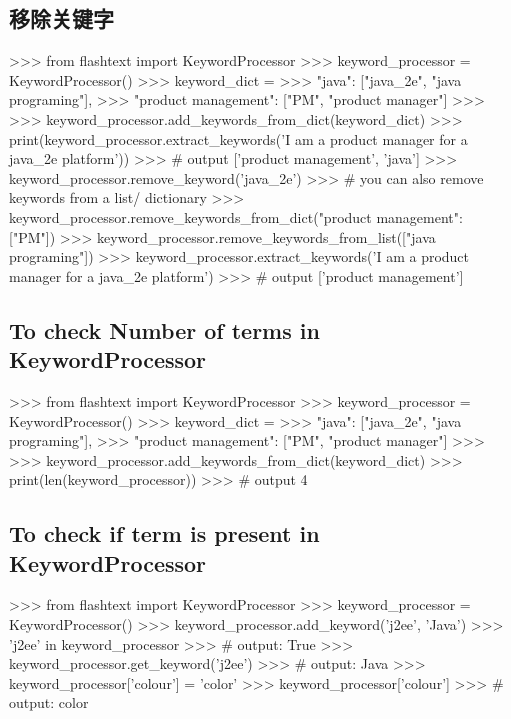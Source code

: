 \documentclass{article}
\begin{document}
\subsection{移除关键字}
\begin{ipythoncode}

>>> from flashtext import KeywordProcessor
>>> keyword_processor = KeywordProcessor()
>>> keyword_dict = {
>>>     "java": ["java_2e", "java programing"],
>>>     "product management": ["PM", "product manager"]
>>> }
>>> keyword_processor.add_keywords_from_dict(keyword_dict)
>>> print(keyword_processor.extract_keywords('I am a product manager for a java_2e platform'))
>>> # output ['product management', 'java']
>>> keyword_processor.remove_keyword('java_2e')
>>> # you can also remove keywords from a list/ dictionary
>>> keyword_processor.remove_keywords_from_dict({"product management": ["PM"]})
>>> keyword_processor.remove_keywords_from_list(["java programing"])
>>> keyword_processor.extract_keywords('I am a product manager for a java_2e platform')
>>> # output ['product management']
\end{ipythoncode}

\subsection{To check Number of terms in KeywordProcessor}
\begin{ipythoncode}

>>> from flashtext import KeywordProcessor
>>> keyword_processor = KeywordProcessor()
>>> keyword_dict = {
>>>     "java": ["java_2e", "java programing"],
>>>     "product management": ["PM", "product manager"]
>>> }
>>> keyword_processor.add_keywords_from_dict(keyword_dict)
>>> print(len(keyword_processor))
>>> # output 4
\end{ipythoncode}

\subsection{To check if term is present in KeywordProcessor}
\begin{ipythoncode}

>>> from flashtext import KeywordProcessor
>>> keyword_processor = KeywordProcessor()
>>> keyword_processor.add_keyword('j2ee', 'Java')
>>> 'j2ee' in keyword_processor
>>> # output: True
>>> keyword_processor.get_keyword('j2ee')
>>> # output: Java
>>> keyword_processor['colour'] = 'color'
>>> keyword_processor['colour']
>>> # output: color
\end{ipythoncode}
\end{document}
